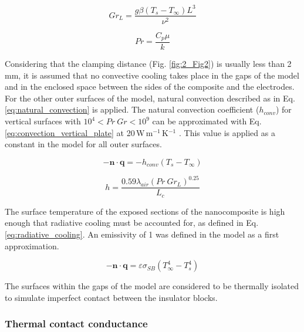 \begin{equation}
Gr_L = \frac{g \beta \left( T_s - T_{\infty} \right) L^3}{\nu^2}
\label{eq:grashof_number}
\end{equation}

\begin{equation}
Pr = \frac{C_p \mu}{k}
\label{eq:prandtl_number}
\end{equation}

Considering that the clamping distance (Fig. \ref{fig:2_Fig2}) is usually less than \mbox{2\,mm}, it is assumed that no convective cooling takes place in the gaps of the model and in the enclosed space between the sides of the composite and the electrodes. 
For the other outer surfaces of the model, natural convection described as in Eq. \ref{eq:natural_convection} is applied. 
The natural convection coefficient ($h_{conv}$) for vertical surfaces with $10^4 < Pr \ Gr < 10^9$ can be approximated with Eq. \ref{eq:convection_vertical_plate} at \mbox{20\,W\,m$^{-1}$\,K$^{-1}$} \cite{Incropera2007}.
This value is applied as a constant in the model for all outer surfaces. 

\begin{equation}
-\mathbf{n} \cdot \mathbf{q} = -h_{conv} \left( T_s -T_{\infty} \right)
\label{eq:natural_convection}
\end{equation}

\begin{equation}
h = \frac{0.59 \lambda_{air} \left(Pr \ Gr_L\right)^{0.25}}{L_c}
\label{eq:convection_vertical_plate}
\end{equation}

The surface temperature of the exposed sections of the nanocomposite is high enough that radiative cooling must be accounted for, as defined in Eq. \ref{eq:radiative_cooling}.
An emissivity of 1 was defined in the model as a first approximation. 

\begin{equation}
- \mathbf{n} \cdot \mathbf{q} = \varepsilon \sigma_{SB} \left( T_{\infty}^4 - T_s^4 \right) 
\label{eq:radiative_cooling}
\end{equation}

The surfaces within the gaps of the model are considered to be thermally isolated to simulate imperfect contact between the insulator blocks.

\subsubsection{Thermal contact conductance}

